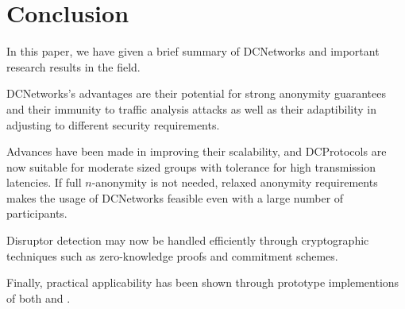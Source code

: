 \section{Conclusion}

In this paper, we have given a brief summary of \acp{DCNetwork} and important
research results in the field.

\acp{DCNetwork}'s advantages are their potential for strong anonymity guarantees
and their immunity to traffic analysis attacks as well as their adaptibility in 
adjusting to different security requirements.

Advances have been made in improving their scalability, and \acp{DCProtocol} 
are now suitable for moderate sized groups with tolerance for high
transmission latencies. If full $n$-anonymity is not needed, relaxed
anonymity requirements makes the usage of \acp{DCNetwork} feasible even with
a large number of participants.

Disruptor detection may now be handled efficiently through cryptographic techniques
such as zero-knowledge proofs and commitment schemes.

Finally, practical applicability has been shown through prototype implementions
of both \Verdict and \Dissent.

\begin{comment}
Important points:

* Non-interactive
* Computationally/Unconditionally secure
* No central trusted party
* Shuffled send
* Security goals: integrity, anonymity, accountability (See dissent 2.3)
* Attack model (dissent 2.3)
* Assumptions, highlight difference between them (Faulty nodes never silent, ..., dissent 2.4)

Sections:

* 88: Base protocol
* 89: Disco (unconditional untraceability, computationally secure serviceability)
* 89: Waidner (Unreliable channel)
* 90: Detection of disruptors
* (03: Herbivore)
* 03: k-anonymity (maybe this is related work instead? weakens security goals to gain efficiency). Small DC subnets.
* 04: dc-revisited (proactive accountability. efficient cheater detection + recovery)
* 10: Dissent
* 13: Verdict

Definitions:

* Anonymity set
* Anonymity terms (cite def paper)
* Anonymity game (dissent [7])
* k-anonymity (k-anonymity)
* Robustness? (k-anonymity 3.3)
* (Partial, Full) Collusion
* Disruption
* Anytrust assumption
* Zero knowledge proofs

Attacks:

* Sybil (dissent [17])
* Sock puppetry (dissent [36])
* Traffic analysis (verdict [4, 34, 38])

Related work:

* Mix nets
* Crowds (dissent [29])
* CliqueNet (k-anon [17])
* Verifiable shuffles
* Group signatures, ring signatures
* Herbivore

Random notes:

* k-anonymous provide anonymity only when most members are honest (see dissent, related work)
* Herbivore provides anonymity only within small subgroups

\end{comment}
